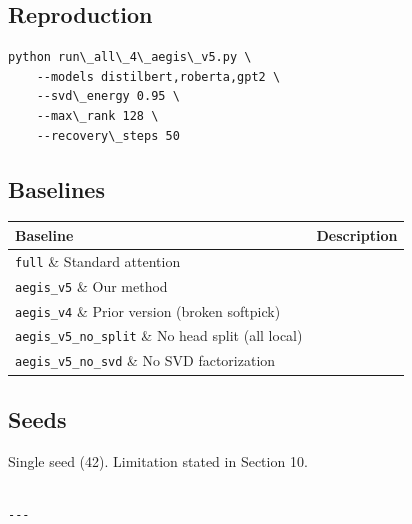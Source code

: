 \subsection{Reproduction}

\begin{lstlisting}
python run\_all\_4\_aegis\_v5.py \
    --models distilbert,roberta,gpt2 \
    --svd\_energy 0.95 \
    --max\_rank 128 \
    --recovery\_steps 50
\end{lstlisting}

\subsection{Baselines}

\begin{table}[H]
\centering
\small
\begin{tabular}{ll}
\toprule
\textbf{Baseline} & \textbf{Description} \\
\midrule
\texttt{full} \& Standard attention \\
\texttt{aegis\_v5} \& Our method \\
\texttt{aegis\_v4} \& Prior version (broken softpick) \\
\texttt{aegis\_v5\_no\_split} \& No head split (all local) \\
\texttt{aegis\_v5\_no\_svd} \& No SVD factorization \\
\bottomrule
\end{tabular}
\end{table}

\subsection{Seeds}

Single seed (42). Limitation stated in Section 10.
\begin{lstlisting}

---
\end{lstlisting}